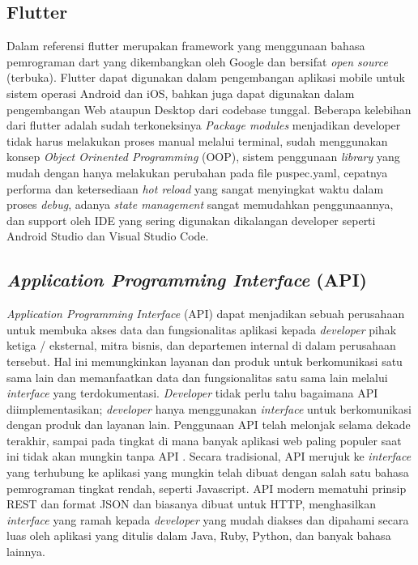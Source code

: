 \begin{flushleft}
\begin{justify}
        \subsection{Flutter}
        Dalam referensi \cite{flutter} flutter merupakan framework yang menggunaan bahasa pemrograman dart yang dikembangkan oleh Google 
        dan bersifat \emph{open source} (terbuka). Flutter dapat digunakan dalam pengembangan aplikasi mobile untuk sistem operasi Android dan iOS, 
        bahkan juga dapat digunakan dalam pengembangan Web ataupun Desktop dari codebase tunggal. 
        Beberapa kelebihan dari flutter adalah sudah terkoneksinya \textit{Package modules} menjadikan developer tidak harus melakukan proses manual melalui terminal, 
        sudah menggunakan konsep \textit{Object Orinented Programming} (OOP), sistem penggunaan \emph{library} yang mudah dengan hanya melakukan perubahan pada file puspec.yaml, cepatnya performa dan ketersediaan \emph{hot reload} yang sangat menyingkat waktu 
        dalam proses \emph{debug}, adanya \emph{state management} sangat memudahkan penggunaannya, dan support oleh IDE yang sering digunakan dikalangan developer seperti Android Studio dan Visual Studio Code.\\


        \subsection{\textit{Application Programming Interface} (API)}
            \textit{Application Programming Interface} (API) dapat menjadikan sebuah perusahaan untuk membuka akses data dan fungsionalitas aplikasi kepada \textit{developer} pihak ketiga / eksternal, mitra bisnis, dan departemen internal di dalam perusahaan tersebut. 
            Hal ini memungkinkan layanan dan produk untuk berkomunikasi satu sama lain dan memanfaatkan data dan fungsionalitas satu sama lain melalui \textit{interface} yang terdokumentasi. 
            \textit{Developer} tidak perlu tahu bagaimana API diimplementasikan; \textit{developer} hanya menggunakan \textit{interface} untuk berkomunikasi dengan produk dan layanan lain. 
            Penggunaan API telah melonjak selama dekade terakhir, sampai pada tingkat di mana banyak aplikasi web paling populer saat ini tidak akan mungkin tanpa API \cite{API}. Secara tradisional, API merujuk ke \textit{interface} yang terhubung ke aplikasi yang mungkin telah dibuat dengan salah satu bahasa pemrograman tingkat rendah, seperti Javascript. API modern mematuhi prinsip REST dan format JSON dan biasanya dibuat untuk HTTP, menghasilkan \textit{interface} yang ramah kepada \textit{developer} yang mudah diakses dan dipahami secara luas oleh aplikasi yang ditulis dalam Java, Ruby, Python, dan banyak bahasa lainnya.
            \\



\end{justify}
\end{flushleft}
